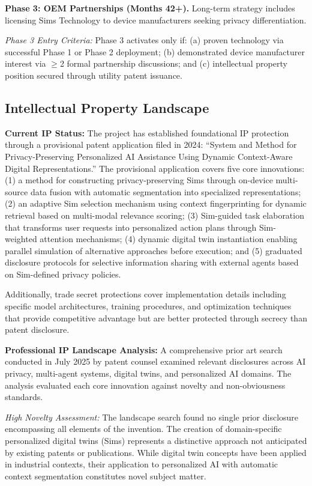 \documentclass[11pt]{article}
\begin{document}
\textbf{Phase 3: OEM Partnerships (Months 42+).}
Long-term strategy includes licensing Sims Technology to device manufacturers 
seeking privacy differentiation.

\textit{Phase 3 Entry Criteria:} Phase 3 activates only if: (a) proven 
technology via successful Phase 1 or Phase 2 deployment; (b) demonstrated 
device manufacturer interest via $\geq$2 formal partnership discussions; and 
(c) intellectual property position secured through utility patent issuance.

\vspace*{-8pt}
\subsection{Intellectual Property Landscape}
\vspace*{-8pt}
\textbf{Current IP Status:}
The project has established foundational IP protection through a provisional patent application filed in 2024: ``System and Method for Privacy-Preserving Personalized AI Assistance Using Dynamic Context-Aware Digital Representations.'' The provisional application covers five core innovations: (1) a method for constructing privacy-preserving Sims through on-device multi-source data fusion with automatic segmentation into specialized representations; (2) an adaptive Sim selection mechanism using context fingerprinting for dynamic retrieval based on multi-modal relevance scoring; (3) Sim-guided task elaboration that transforms user requests into personalized action plans through Sim-weighted attention mechanisms; (4) dynamic digital twin instantiation enabling parallel simulation of alternative approaches before execution; and (5) graduated disclosure protocols for selective information sharing with external agents based on Sim-defined privacy policies.

Additionally, trade secret protections cover implementation details including specific model architectures, training procedures, and optimization techniques that provide competitive advantage but are better protected through secrecy than patent disclosure.

\textbf{Professional IP Landscape Analysis:}
A comprehensive prior art search conducted in July 2025 by patent counsel examined relevant disclosures across AI privacy, multi-agent systems, digital twins, and personalized AI domains. The analysis evaluated each core innovation against novelty and non-obviousness standards.

\textit{High Novelty Assessment:} The landscape search found no single prior disclosure encompassing all elements of the invention. The creation of domain-specific personalized digital twins (Sims) represents a distinctive approach not anticipated by existing patents or publications. While digital twin concepts have been applied in industrial contexts, their application to personalized AI with automatic context segmentation constitutes novel subject matter.
\end{document}
